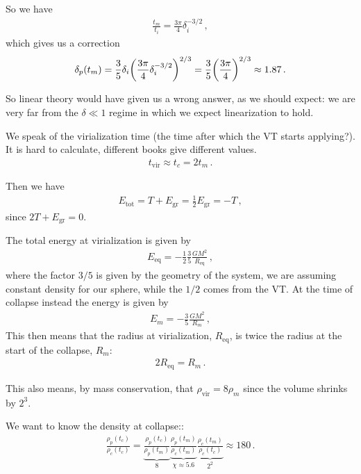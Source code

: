 \documentclass[main.tex]{subfiles}
\begin{document}
So we have 
%
\begin{align}
\frac{t_m}{t_i} 
=\frac{3 \pi }{4} \delta_{i}^{-3/2}
\,,
\end{align}
%
which gives us a correction 
%
\begin{align}
\delta_{p}(t_m) =
\frac{3}{5} \delta_{i} \qty( \frac{3 \pi }{4} \delta_{i}^{-3/2})^{2/3}
=\frac{3}{5} \qty(\frac{3 \pi }{4})^{2/3} \approx 1.87
\,.
\end{align}

So linear theory would have given us a wrong answer, as we should expect: we are very far from the \(\delta \ll 1\) regime in which we expect linearization to hold. 

We speak of the virialization time (the time after which the VT starts applying?). It is hard to calculate, different books give different values. 
%
\begin{align}
t _{\text{vir}} \approx t_c = 2 t_m
\,.
\end{align}

Then we have 
%
\begin{align}
E _{\text{tot}} = T + E _{\text{gr}} = \frac{1}{2} E _{\text{gr}} = - T  
\,,
\end{align}
%
since \(2 T + E _{\text{gr}} = 0\).

The total energy at virialization is given by 
%
\begin{align}
E _{\text{eq}} = - \frac{1}{2} \frac{3}{5} \frac{GM^2}{R _{\text{eq}}}
\,,
\end{align}
%
where the factor \(3/5\) is given by the geometry of the system, we are assuming constant density for our sphere, while the \(1/2\) comes from the VT.  
At the time of collapse instead the energy is given by 
%
\begin{align}
E_m =- \frac{3}{5} \frac{GM^2}{R_m}
\,,
\end{align}
%
This then means that the radius at virialization, \(R _{\text{eq}}\), is twice the radius at the start of the collapse, \(R_m\): 
%
\begin{align}
2 R _{\text{eq}} = R_{m}
\,.
\end{align}

This also means, by mass conservation, that \(\rho _{\text{vir}} = 8 \rho_{m}\) since the volume shrinks by \(2^{3}\). 

We want to know the density at collapse:: 
%
\begin{align}
\frac{\rho_{p}(t_c)}{\rho_{c}(t_c)} = \underbrace{\frac{\rho_{p}(t_c)}{\rho_{p}(t_m)}}_{8} \underbrace{\frac{\rho_{p}(t_m)}{\rho_{c}(t_m)}}_{\chi \approx 5.6} \underbrace{\frac{\rho_{c}(t_m)}{\rho_{c} (t_c)}}_{2^2}
\approx 180
\,.
\end{align}
\end{document}

